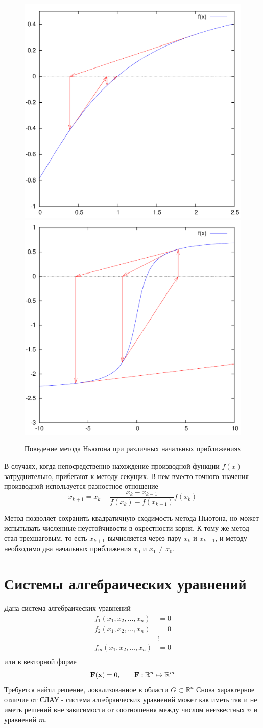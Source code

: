 \documentclass[professionalfonts,compress,unicode]{beamer}
\begin{document}
{
	\begin{figure}%
	\includegraphics[width=0.5\columnwidth]{nw.pdf}%
	\includegraphics[width=0.5\columnwidth]{nw2.pdf}%
	\caption{Поведение метода Ньютона при различных начальных приближениях}%
	\end{figure}
}

{
	В случаях, когда непосредственно нахождение производной функции $f(x)$ затруднительно, прибегают к методу секущих.
	В нем вместо точного значения производной используется разностное отношение 
	$$
	x_{k+1} = x_k - \frac{x_k - x_{k-1}}{f(x_k) - f(x_{k-1})} f(x_k)
	$$
	
	Метод позволяет сохранить квадратичную сходимость метода Ньютона, но может испытывать численные неустойчивости в окрестности корня.
	К тому же метод стал трехшаговым, то есть $x_{k+1}$ вычисляется через пару $x_k$ и $x_{k-1}$, и методу необходимо два начальных приближения $x_0$ и $x_1 \neq x_0$.
}

\section{Системы алгебраических уравнений}
{
	Дана система алгебраических уравнений
	\begin{align*}
	f_1(x_1,x_2,\dots,x_n) &= 0\\
	f_2(x_1,x_2,\dots,x_n) &= 0\\
	&\vdots\\
	f_m(x_1,x_2,\dots,x_n) &= 0\\
	\end{align*}
	или в векторной форме
	$$
	{\bf F}({\bf x}) = 0, \qquad {\bf F}: \mathbb{R}^n \mapsto \mathbb{R}^m
	$$
	Требуется найти решение, локализованное в области $G \subset \mathbb{R}^n$
	Снова характерное отличие от СЛАУ - система алгебраических уравнений может как иметь так и не иметь решений вне зависимости от 
	соотношения между числом неизвестных $n$ и уравнений $m$.
}
\end{document}
